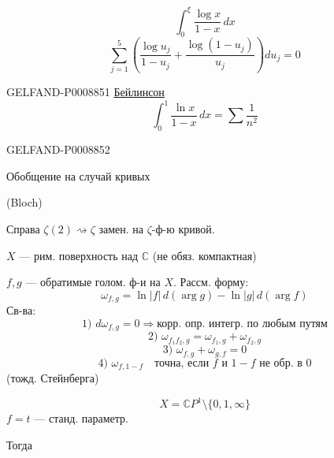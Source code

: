 \begin{equation*}
\int_0^\xi\frac{\log x}{1-x}\,dx
\tag{1}
\end{equation*}
\begin{equation*}
\sum_{j=1}^{5}\left(\frac{\log u_j}{1-u_j}+\frac{\log(1-u_j)}{u_j}\right)du_j=0
\tag{2}
\end{equation*}


\begin{GelfandAdjacentEvidence}{GELFAND-P000885}{1}
\uline{Бейлинсон}
\begin{equation*}
\int_0^1\frac{\ln x}{1-x}\,dx=\sum\frac{1}{n^2}
\tag{3}
\end{equation*}
\end{GelfandAdjacentEvidence}
\begin{GelfandAdjacentEvidence}{GELFAND-P000885}{2}


Обобщение на случай кривых

(Bloch)

Справа $\zeta(2)\rightsquigarrow\zeta$ замен. на $\zeta$-ф-ю кривой.

$X$ --- рим. поверхность над $\mathbb C$ (не обяз. компактная)

$f,g$ --- обратимые голом. ф-и на $X$. Рассм. форму:
\begin{equation*}
\omega_{f,g}=\ln|f|\,d(\arg g)-\ln|g|\,d(\arg f)
\tag{4}
\end{equation*}
Св-ва:
\begin{equation*}
\text{1) }d\omega_{f,g}=0\Rightarrow\text{корр. опр. интегр. по любым путям}
\tag{5}
\end{equation*}
\begin{equation*}
\text{2) }\omega_{f_1f_2,g}=\omega_{f_1,g}+\omega_{f_2,g}
\tag{6}
\end{equation*}
\begin{equation*}
\text{3) }\omega_{f,g}+\omega_{g,f}=0
\tag{7}
\end{equation*}
\begin{equation*}
\text{4) }\omega_{f,1-f}\quad\text{точна, если }f\text{ и }1-f\text{ не обр. в }0
\tag{8}
\end{equation*}
(тожд. Стейнберга)

\begin{equation*}
X=\mathbb C P^1\setminus\{0,1,\infty\}
\end{equation*}
$f=t$ --- станд. параметр.

Тогда

\end{GelfandAdjacentEvidence}
